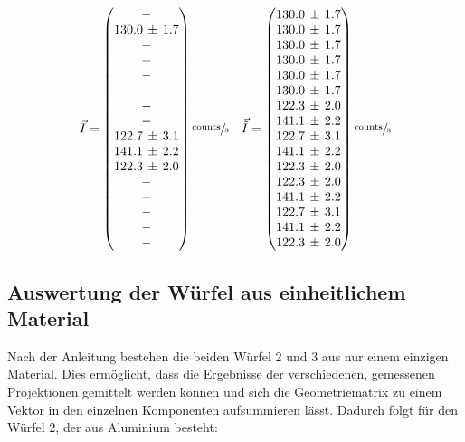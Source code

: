 \begin{equation}
	\vec{I}=
	\begin{pmatrix}
		- \\
		130.0\,\pm\,1.7 \\
		- \\
		- \\
	  - \\
		- \\
		- \\
		- \\
		122.7\,\pm\,3.1 \\
		141.1\,\pm\,2.2 \\
		122.3\,\pm\,2.0 \\
		- \\
    - \\
    - \\
    - \\
    -
	\end{pmatrix}
	\sfrac{\text{counts}}{\text{s}}\quad
	\vec{\tilde{I}}=
	\begin{pmatrix}
		130.0\,\pm\,1.7 \\
		130.0\,\pm\,1.7 \\
		130.0\,\pm\,1.7 \\
		130.0\,\pm\,1.7 \\
		130.0\,\pm\,1.7 \\
		130.0\,\pm\,1.7 \\
		122.3\,\pm\,2.0 \\
		141.1\,\pm\,2.2 \\
		122.7\,\pm\,3.1 \\
		141.1\,\pm\,2.2 \\
		122.3\,\pm\,2.0 \\
		122.3\,\pm\,2.0 \\
    141.1\,\pm\,2.2 \\
    122.7\,\pm\,3.1 \\
    141.1\,\pm\,2.2 \\
    122.3\,\pm\,2.0 \\
	\end{pmatrix}
    \sfrac{\text{counts}}{\text{s}}
	\label{eq:int}
\end{equation}

\subsection{Auswertung der Würfel aus einheitlichem Material}

Nach der Anleitung bestehen die beiden Würfel 2 und 3 aus nur einem einzigen Material. Dies ermöglicht, dass die Ergebnisse der verschiedenen,
gemessenen Projektionen gemittelt werden können und sich die Geometriematrix zu einem Vektor in den einzelnen Komponenten aufsummieren lässt.
Dadurch folgt für den Würfel 2, der aus Aluminium besteht:


